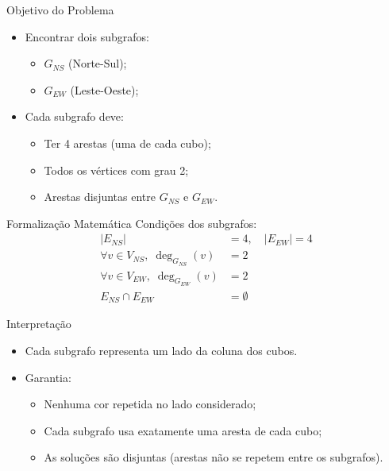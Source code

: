 \documentclass{beamer}
\begin{document}
\begin{frame}{Objetivo do Problema}
    \begin{itemize}
        \item Encontrar dois subgrafos:
        \begin{itemize}
            \item $G_{NS}$ (Norte-Sul);
            \item $G_{EW}$ (Leste-Oeste);
        \end{itemize}
        \item Cada subgrafo deve:
        \begin{itemize}
            \item Ter 4 arestas (uma de cada cubo);
            \item Todos os vértices com grau 2;
            \item Arestas disjuntas entre $G_{NS}$ e $G_{EW}$.
        \end{itemize}
    \end{itemize}
\end{frame}


\begin{frame}{Formalização Matemática}
    Condições dos subgrafos:
    \begin{align*}
        |E_{NS}| &= 4, \quad |E_{EW}| = 4 \\
        \forall v \in V_{NS}, \; \deg_{G_{NS}}(v) &= 2 \\
        \forall v \in V_{EW}, \; \deg_{G_{EW}}(v) &= 2 \\
        E_{NS} \cap E_{EW} &= \emptyset
    \end{align*}
\end{frame}

\begin{frame}{Interpretação}
    \begin{itemize}
        \item Cada subgrafo representa um lado da coluna dos cubos.
        \item Garantia:
        \begin{itemize}
            \item Nenhuma cor repetida no lado considerado;
            \item Cada subgrafo usa exatamente uma aresta de cada cubo;
            \item As soluções são disjuntas (arestas não se repetem entre os subgrafos).
        \end{itemize}
    \end{itemize}
\end{frame}
\end{document}
